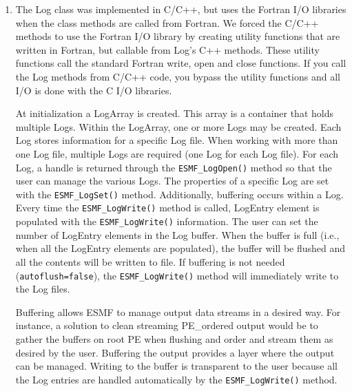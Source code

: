 %


\begin{enumerate}

\item The Log class was implemented in C/C++, but uses the Fortran I/O libraries when
the class methods are called from Fortran. We forced the C/C++ methods 
to use the Fortran I/O library by creating 
utility functions that are written in Fortran, but callable from Log's C++ methods.
These utility functions call the standard Fortran write, open and close functions.
If you call the Log methods from C/C++ code, you bypass the utility functions
and all I/O is done with the C I/O libraries.

At initialization a LogArray is created.  This array is a container 
that holds multiple Logs.  Within the LogArray, one or more Logs may be created.  
Each Log stores information for a specific Log file.   When working with 
more than one Log file, multiple Logs are required (one Log for each Log file).  
For each Log, a handle is returned through the {\tt ESMF\_LogOpen()} method so 
that the user can manage the various Logs.  The properties of a specific 
Log are set with the {\tt ESMF\_LogSet()} method.  Additionally, buffering 
occurs within a Log.  Every time the {\tt ESMF\_LogWrite()} method is called, 
LogEntry element is populated with the {\tt ESMF\_LogWrite()} information.  
The user can set the number of LogEntry elements in the Log buffer.  When 
the buffer is full (i.e., when all the LogEntry elements are populated), 
the buffer will be flushed and all the contents will be written to file.  
If buffering is not needed ({\tt autoflush=false}), the {\tt ESMF\_LogWrite()} 
method will immediately write to the Log files. 

Buffering allows ESMF to manage output data streams in a desired way.  
For instance, a solution to clean streaming PE\_ordered output would be to 
gather the buffers on root PE when flushing and order and stream them as 
desired by the user.  Buffering the output provides a layer where the output 
can be managed.  Writing to the buffer is transparent to the user because 
all the Log entries are handled automatically by the {\tt ESMF\_LogWrite()} 
method. 

\end{enumerate}




